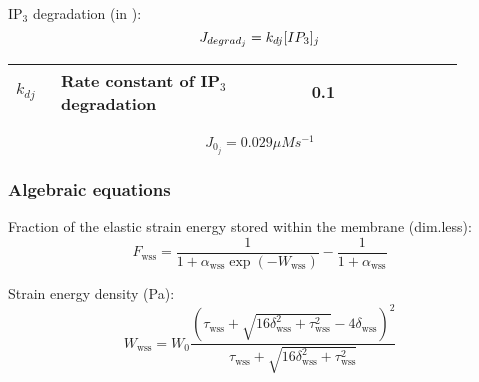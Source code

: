\documentclass[fleqn]{report}
\numberwithin{equation}{section}
\numberwithin{equation}{section}
\newcommand{\Ca}{\text{Ca$^{2+}$}}
\newcommand{\uMpers}{\textmu M\,s$^{-1}$}
\begin{document}
							\\
							IP$_{3}$ degradation (in \uMs):  
							\begin{equation} \label{eq:Jdegradj}
							J_{degrad_{j}}= k_{dj} [IP_{3}]_{j}
							\end{equation}
							\begin{table}[h!]
							\centering
							\begin{tabular}{ p{0.09\linewidth}  >{\footnotesize} p{0.5\linewidth}  >{\footnotesize} p{0.27\linewidth} >{\footnotesize} p{0.03\linewidth} }
							\hline
							$k_{dj}$      			& Rate constant of IP$_{3}$ degradation						 		& 0.1 \pers		& \cite{Koenigsberger2006} \\
							\hline
							\end{tabular}
							\label{tab:Jdegradj}
							\end{table}
			\begin{equation}
			J_{0_{j}}=0.029 \mu M s^{-1}
			\end{equation}
			\subsubsection*{Algebraic equations}
	
				
				
				Fraction of the elastic strain energy stored within the membrane (dim.less): %
				\begin{equation} 
					F_{\text{wss}} = \frac{1}{1+\alpha_{\text{wss}} \exp(-W_{\text{wss}})} - \frac{1}{1+\alpha_{\text{wss}}}
				\end{equation}	
				
				Strain energy density (Pa): %
				\begin{equation} 
					W_{\text{wss}} = W_0 \frac{(\tau_{\text{wss}} + \sqrt{16 \delta_{\text{wss}}^2 + \tau_{\text{wss}}^2} - 4 \delta_{\text{wss}})^2}{\tau_{\text{wss}} + \sqrt{16\delta_{\text{wss}}^2 + \tau_{\text{wss}}^2}}
				\end{equation}	
				
\end{document}
